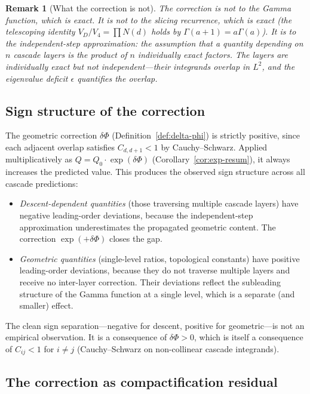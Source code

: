 \documentclass[11pt,a4paper]{article}
\newtheorem{remark}[theorem]{Remark}
\begin{document}
\begin{remark}[What the correction is not]
The correction is not to the Gamma function, which is exact. It is not to the slicing recurrence, which is exact (the telescoping identity $V_D/V_4 = \prod N(d)$ holds by $\Gamma(a+1) = a\Gamma(a)$). It is to the \emph{independent-step approximation}: the assumption that a quantity depending on $n$ cascade layers is the product of $n$ individually exact factors. The layers are individually exact but not independent---their integrands overlap in $L^2$, and the eigenvalue deficit $\epsilon$ quantifies the overlap.
\end{remark}

\subsection{Sign structure of the correction}

The geometric correction $\delta\Phi$ (Definition~\ref{def:delta-phi}) is strictly positive, since each adjacent overlap satisfies $C_{d,d+1}<1$ by Cauchy--Schwarz. Applied multiplicatively as $Q = Q_0\cdot\exp(\delta\Phi)$ (Corollary~\ref{cor:exp-resum}), it always increases the predicted value. This produces the observed sign structure across all cascade predictions:

\begin{itemize}
\item \emph{Descent-dependent quantities} (those traversing multiple cascade layers) have negative leading-order deviations, because the independent-step approximation underestimates the propagated geometric content. The correction $\exp(+\delta\Phi)$ closes the gap.
\item \emph{Geometric quantities} (single-level ratios, topological constants) have positive leading-order deviations, because they do not traverse multiple layers and receive no inter-layer correction. Their deviations reflect the subleading structure of the Gamma function at a single level, which is a separate (and smaller) effect.
\end{itemize}

The clean sign separation---negative for descent, positive for geometric---is not an empirical observation. It is a consequence of $\delta\Phi > 0$, which is itself a consequence of $C_{ij} < 1$ for $i\neq j$ (Cauchy--Schwarz on non-collinear cascade integrands).

\subsection{The correction as compactification residual}
\end{document}
